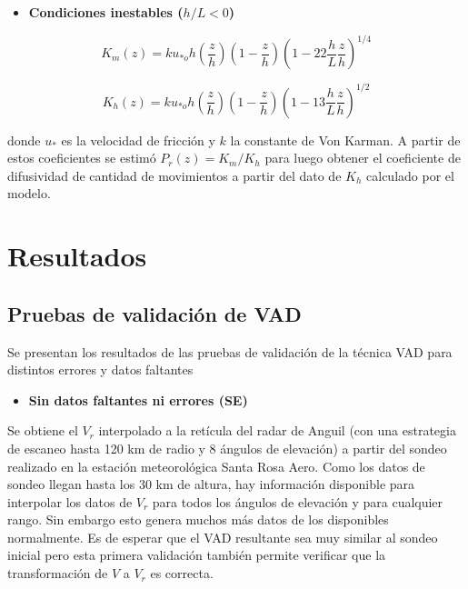 \documentclass[12pt,spanish,oneside, a4paper]{book}
\providecommand{\tightlist}{%
  \setlength{\itemsep}{0pt}\setlength{\parskip}{0pt}}
\begin{document}
\begin{itemize}
\tightlist
\item
  \textbf{Condiciones inestables (\(h/L < 0\))}
\end{itemize}

\begin{equation} \label{k-3}
K_m(z) =  ku_{*o}h\left (\frac{z}{h} \right )\left(1-\frac{z}{h} \right)\left (1 - 22\frac{h}{L}\frac{z}{h} \right)^{1/4}
\end{equation}

\begin{equation} \label{k-4}
K_h(z) =  ku_{*o}h\left (\frac{z}{h} \right )\left(1-\frac{z}{h} \right)\left (1 - 13\frac{h}{L}\frac{z}{h} \right)^{1/2}
\end{equation}

donde \(u_*\) es la velocidad de fricción y \(k\) la constante de Von
Karman. A partir de estos coeficientes se estimó \(P_r(z) = K_m/K_h\)
para luego obtener el coeficiente de difusividad de cantidad de
movimientos a partir del dato de \(K_h\) calculado por el modelo.

\chapter{Resultados}\label{resultados}

\section{\texorpdfstring{Pruebas de validación de VAD
\label{sec-validacion}}{Pruebas de validación de VAD }}\label{pruebas-de-validacion-de-vad}

Se presentan los resultados de las pruebas de validación de la técnica
VAD para distintos errores y datos faltantes

\begin{itemize}
\tightlist
\item
  \textbf{Sin datos faltantes ni errores (SE)}
\end{itemize}

Se obtiene el \(V_r\) interpolado a la retícula del radar de Anguil (con
una estrategia de escaneo hasta 120 km de radio y 8 ángulos de
elevación) a partir del sondeo realizado en la estación meteorológica
Santa Rosa Aero. Como los datos de sondeo llegan hasta los 30 km de
altura, hay información disponible para interpolar los datos de \(V_r\)
para todos los ángulos de elevación y para cualquier rango. Sin embargo
esto genera muchos más datos de los disponibles normalmente. Es de
esperar que el VAD resultante sea muy similar al sondeo inicial pero
esta primera validación también permite verificar que la transformación
de \(V\) a \(V_r\) es correcta.
\end{document}
